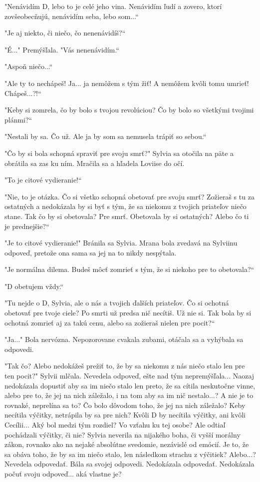 \documentclass{book}
\begin{document}
"$ $Nenávidím D, lebo to je celé jeho vina. Nenávidím ľudí a zovero, ktorí zovšeobecňujú, nenávidím seba, lebo som...“

"$ $Je aj niekto, či niečo, čo nenenávidíš?“

"$ $É..."$ $ Premýšľala. "$ $Vás nenenávidím.“

"$ $Aspoň niečo...“

"$ $Ale ty to nechápeš! Ja... ja nemôžem s tým žiť! A nemôžem kvôli tomu umrieť! Chápeš...?!“

"$ $Keby si zomrela, čo by bolo s tvojou revolúciou? Čo by bolo so všetkými tvojimi plánmi?“

"$ $Nestali by sa. Čo už. Ale ja by som sa nemusela trápiť so sebou.“

"$ $Čo by si bola schopná spraviť pre svoju smrť?"$ $ Sylvia sa otočila na päte a obrátila sa zas ku ním. Mračila sa a hľadela Loviise do očí.

"$ $To je citové vydieranie!“

"$ $Nie, to je otázka. Čo si všetko schopná obetovať pre svoju smrť? Zožieraš s tu za ostatných a nedokázala by si byť s tým, že sa niekomu z tvojich priateľov niečo stane. Tak čo by si obetovala? Pre smrť. Obetovala by si ostatných? Alebo čo ti je prednejšie?“

"$ $Je to citové vydieranie!"$ $ Bránila sa Sylvia. Mrana bola zvedavá na Sylviinu odpoveď, pretože ona sama sa jej na to nikdy nespýtala.

"$ $Je normálna dilema. Budeš môcť zomrieť s tým, že si niekoho pre to obetovala?“

"$ $D obetujem vždy.“

"$ $Tu nejde o D, Sylvia, ale o nás a tvojich ďalších priateľov. Čo si ochotná obetovať pre tvoje ciele? Po smrti už predsa nič necítiš. Už nie si. Tak bola by si ochotná zomrieť aj za takú cenu, alebo sa zožieraš nielen pre pocit?“

"$ $Ja..."$ $ Bola nervózna. Nepozorovane cvakala zubami, otáčala sa a vyhýbala sa odpovedi.

"$ $Tak čo? Alebo nedokážeš prežiť to, že by sa niekomu z nás niečo stalo len pre ten pocit?"$ $ Sylvii mlčala. Nevedela odpoveď, ešte nad tým nepremýšľala... Naozaj nedokázala dopustiť aby sa im niečo stalo len preto, že sa cítila neskutočne vinne, alebo pre to, že jej na nich záležalo, i na tom aby sa im nič nestalo...? A nie je to rovnaké, neprelína sa to? Čo bolo dôvodom toho, že jej na nich záležalo? Keby necítila výčitky, netrápila by sa pre nich? Kvôli D by necítila výčitky, ani kvôli Cecílii... Aký bol medzi tým rozdiel? Vo vzťahu ku tej osobe? Ale odtiaľ pochádzali výčitky, či nie? Sylvia neverila na nijakého boha, či vyšší morálny zákon, rovnako ako na nejaké absolútne svedomie, nezávislé od emócií. Je to, že sa obáva toho, že by sa im niečo stalo, len následkom strachu z výčitiek? Alebo...? Nevedela odpovedať. Bála sa svojej odpovedi. Nedokázala odpovedať. Nedokázala počuť svoju odpoveď... aká vlastne je?
\end{document}
